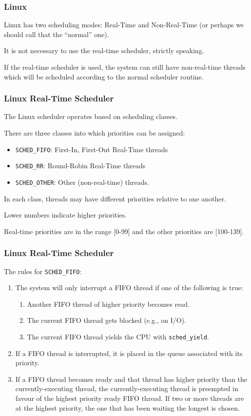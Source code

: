 \begin{frame}
\frametitle{Linux}

Linux has two scheduling modes: Real-Time and Non-Real-Time (or perhaps we should call that the ``normal'' one). 

It is not necessary to use the real-time scheduler, strictly speaking. 

If the real-time scheduler is used, the system can still have non-real-time threads which will be scheduled according to the normal scheduler routine.

\end{frame}

\begin{frame}
\frametitle{Linux Real-Time Scheduler}

The Linux scheduler operates based on \alert{scheduling classes}.

There are three classes into which priorities can be assigned:

\begin{itemize}
	\item \texttt{SCHED\_FIFO}: First-In, First-Out Real-Time threads
	\item \texttt{SCHED\_RR}: Round-Robin Real-Time threads
	\item \texttt{SCHED\_OTHER}: Other (non-real-time) threads.
\end{itemize}


In each class, threads may have different priorities relative to one another. 

Lower numbers indicate higher priorities. 

Real-time priorities are in the range [0-99] and the other priorities are [100-139].

\end{frame}

\begin{frame}
\frametitle{Linux Real-Time Scheduler}

The rules for \texttt{SCHED\_FIFO}:

\begin{enumerate}
	\item The system will only interrupt a FIFO thread if one of the following is true:
	\begin{enumerate}
		\item Another FIFO thread of higher priority becomes read.
		\item The current FIFO thread gets blocked (e.g., on I/O).
		\item The current FIFO thread yields the CPU with \texttt{sched\_yield}.
	\end{enumerate}
	\item If a FIFO thread is interrupted, it is placed in the queue associated with its priority.
	\item If a FIFO thread becomes ready and that thread has higher priority than the currently-executing thread, the currently-executing thread is preempted in favour of the highest priority ready FIFO thread. If two or more threads are at the highest priority, the one that has been waiting the longest is chosen.
\end{enumerate}


\end{frame}

